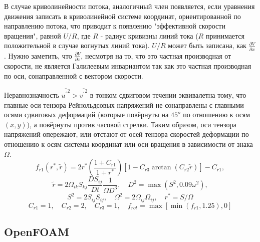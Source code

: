 \documentclass[pdftex,a4paper,12pt]{article}
\begin{document}
		В случае криволинейности потока, аналогичный член появляется, если уравнения движения записать в криволинейной системе координат, ориентированной по направлению потока, что приводит к появлению "эффективной скорости вращения", равной $U/R$, где $R$ - радиус кривизны линий тока ($R$ принимается положительной в случае вогнутых линий тока). $U/R$ может быть записана, как $\frac{\partial V}{\partial x}$. Нужно заметить, что $\frac{\partial V}{\partial x}$, несмотря на то, что это частная производная от скорости, не является Галилеевым инвариантом так как это частная производная по оси, сонаправленной с вектором скорости.
		
		Неравнозначность $\overline{{u^{'}}^2} > \overline{{v^{'}}^2}$ в тонком сдвиговом течении эквивалетна тому, что главные оси тензора Рейнольдсовых напряжений не сонаправлены с главными осями сдвиговых деформаций (которые повёрнуты на $45^o$ по отношению к осям $(x, y)$), а повёрнуты против часовой стрелки. Таким образом, оси тензора напряжений опережают, или отстают от осей тензора скоростей деформации по отношению к осям системы координат или оси вращения в зависимости от знака $\Omega$.
		\begin{equation}
				f_{r1}(r^*,\tilde{r}) = 2r^*\left( \frac{1+C_{r1}}{1+ r^*} \right)\left[ 1-C_{r3}\arctan{(C_{r2}\tilde{r})} \right] - C_{r1},
		\end{equation}
		\begin{equation}
				\tilde{r} = 2\Omega_{ik}S_{kj}\frac{DS_{ij}}{Dt}\frac{1}{\Omega D^3}, \quad D^2 = \max(S^2, 0.09 \omega^2),
		\end{equation}
		$$
				S^2 = 2 S_{ij}S_{ij}, \quad \Omega^2 = 2 \Omega_{ij} \Omega_{ij}, \quad r^* = S/\Omega
		$$
		$$
				C_{r1} = 1, \quad C_{r2} = 2, \quad C_{r3} = 1, \quad f_{rot} = \max[\min(f_{r1},1.25),0]
		$$
	\newpage
	\subsection{OpenFOAM}
\end{document}
